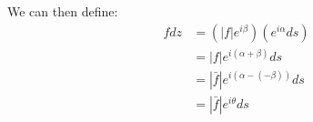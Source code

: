 \documentclass[preview]{standalone}
\begin{document}
\begin{center}
We can then define: \begin{align*} f dz &= \left(|f|e^{i\beta}\right)\left(e^{i\alpha}ds\right) \\ &= |f|e^{i(\alpha + \beta)}ds \\ &= |\bar{f}|e^{i(\alpha - (-\beta))}ds \\ &= |\bar{f}|e^{i\theta}ds \end{align*}
\end{center}
\end{document}
